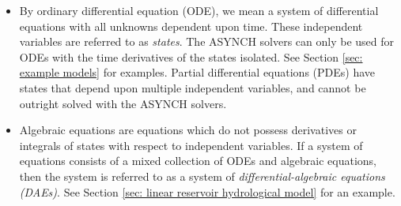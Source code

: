 \documentclass[12pt]{article}
\begin{document}
\begin{itemize}
 \item By ordinary differential equation (ODE), we mean a system of differential equations with all unknowns dependent upon time. These independent variables are referred to as \emph{states}. The ASYNCH solvers can only be used for ODEs with the time derivatives of the states isolated. See Section \ref{sec: example models} for examples. Partial differential equations (PDEs) have states that depend upon multiple independent variables, and cannot be outright solved with the ASYNCH solvers.
 
 \item Algebraic equations are equations which do not possess derivatives or integrals of states with respect to independent variables. If a system of equations consists of a mixed collection of ODEs and algebraic equations, then the system is referred to as a system of \emph{differential-algebraic equations (DAEs)}. See Section \ref{sec: linear reservoir hydrological model} for an example.
 

\end{itemize}
\end{document}
